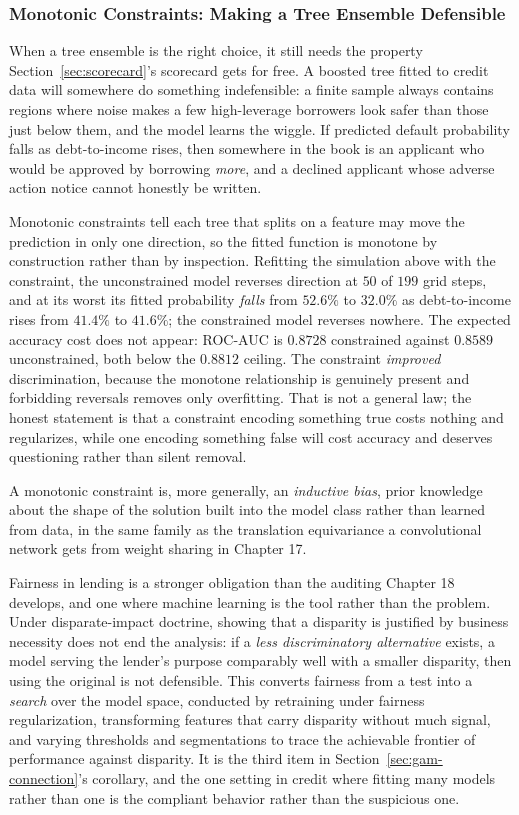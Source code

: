 \documentclass[../ai_in_finance]{subfiles}
\begin{document}
\subsubsection*{Monotonic Constraints: Making a Tree Ensemble Defensible}
\label{sec:monotonic}

When a tree ensemble is the right choice, it still needs the property Section~\ref{sec:scorecard}'s scorecard gets for free. A boosted tree fitted to credit data will somewhere do something indefensible: a finite sample always contains regions where noise makes a few high-leverage borrowers look safer than those just below them, and the model learns the wiggle. If predicted default probability falls as debt-to-income rises, then somewhere in the book is an applicant who would be approved by borrowing \emph{more}, and a declined applicant whose adverse action notice cannot honestly be written.

Monotonic constraints tell each tree that splits on a feature may move the prediction in only one direction, so the fitted function is monotone by construction rather than by inspection. Refitting the simulation above with the constraint, the unconstrained model reverses direction at $50$ of $199$ grid steps, and at its worst its fitted probability \emph{falls} from $52.6\%$ to $32.0\%$ as debt-to-income rises from $41.4\%$ to $41.6\%$; the constrained model reverses nowhere. The expected accuracy cost does not appear: ROC-AUC is $0.8728$ constrained against $0.8589$ unconstrained, both below the $0.8812$ ceiling. The constraint \emph{improved} discrimination, because the monotone relationship is genuinely present and forbidding reversals removes only overfitting. That is not a general law; the honest statement is that a constraint encoding something true costs nothing and regularizes, while one encoding something false will cost accuracy and deserves questioning rather than silent removal.

A monotonic constraint is, more generally, an \emph{inductive bias}, prior knowledge about the shape of the solution built into the model class rather than learned from data, in the same family as the translation equivariance a convolutional network gets from weight sharing in Chapter 17.


Fairness in lending is a stronger obligation than the auditing Chapter 18 develops, and one where machine learning is the tool rather than the problem. Under disparate-impact doctrine, showing that a disparity is justified by business necessity does not end the analysis: if a \emph{less discriminatory alternative} exists, a model serving the lender's purpose comparably well with a smaller disparity, then using the original is not defensible. This converts fairness from a test into a \emph{search} over the model space, conducted by retraining under fairness regularization, transforming features that carry disparity without much signal, and varying thresholds and segmentations to trace the achievable frontier of performance against disparity. It is the third item in Section~\ref{sec:gam-connection}'s corollary, and the one setting in credit where fitting many models rather than one is the compliant behavior rather than the suspicious one.
\end{document}
